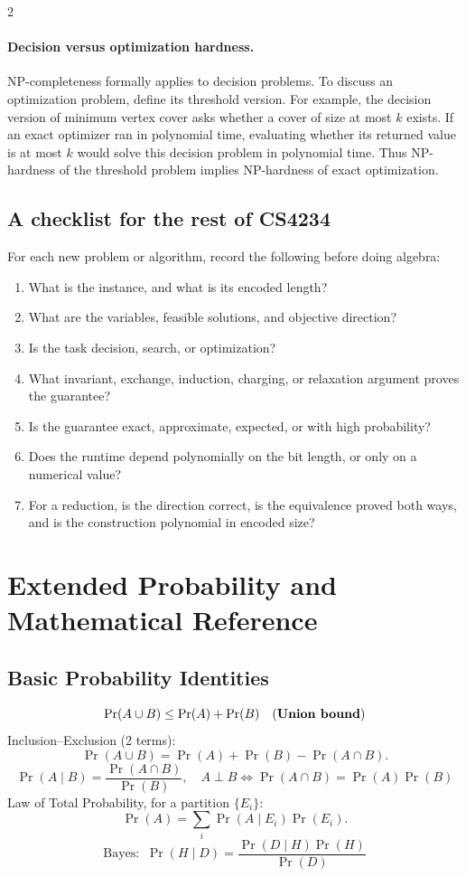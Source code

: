 \documentclass[8pt]{extarticle}
\theoremstyle{definition}
\begin{document}
\begin{multicols*}{2}
\paragraph{Decision versus optimization hardness.}
NP-completeness formally applies to decision problems.  To discuss an
optimization problem, define its threshold version.  For example, the
decision version of minimum vertex cover asks whether a cover of size at most
$k$ exists.  If an exact optimizer ran in polynomial time, evaluating whether
its returned value is at most $k$ would solve this decision problem in
polynomial time.  Thus NP-hardness of the threshold problem implies NP-hardness
of exact optimization.

\subsection{A checklist for the rest of CS4234}

For each new problem or algorithm, record the following before doing algebra:
\begin{enumerate}
  \item What is the instance, and what is its encoded length?
  \item What are the variables, feasible solutions, and objective direction?
  \item Is the task decision, search, or optimization?
  \item What invariant, exchange, induction, charging, or relaxation argument
        proves the guarantee?
  \item Is the guarantee exact, approximate, expected, or with high
        probability?
  \item Does the runtime depend polynomially on the bit length, or only on a
        numerical value?
  \item For a reduction, is the direction correct, is the equivalence proved
        both ways, and is the construction polynomial in encoded size?
\end{enumerate}

\bigskip




\section{Extended Probability and Mathematical Reference}\label{app:formulas}
\subsection{Basic Probability Identities}
\[
\Pr(A\cup B)\le \Pr(A)+\Pr(B)\quad\text{(\textbf{Union bound})}
\]
Inclusion--Exclusion (2 terms):
\[
\Pr(A\cup B)=\Pr(A)+\Pr(B)-\Pr(A\cap B).
\]
\[
\Pr(A\mid B)=\frac{\Pr(A\cap B)}{\Pr(B)},\quad A\perp B\iff \Pr(A\cap B)=\Pr(A)\Pr(B)
\]
Law of Total Probability, for a partition $\{E_i\}$:
\[
\Pr(A)=\sum_i \Pr(A\mid E_i)\Pr(E_i).
\]
\[
\text{Bayes: }\ \Pr(H\mid D)=\frac{\Pr(D\mid H)\Pr(H)}{\Pr(D)}
\]


\end{multicols*}
\end{document}

